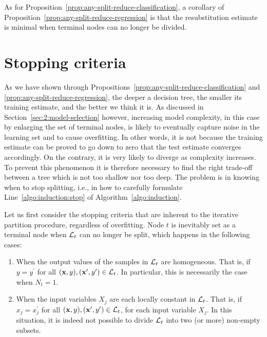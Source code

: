 As for Proposition~\ref{prop:any-split-reduce-classification}, a corollary of Proposition~\ref{prop:any-split-reduce-regression}
is that the resubstitution estimate is minimal when terminal nodes can no longer be divided.


\section{Stopping criteria}
\label{sec:3:stop}

As we have shown through Propositions~\ref{prop:any-split-reduce-classification}
and \ref{prop:any-split-reduce-regression}, the deeper a
decision tree, the smaller its training estimate, and the better we think it
is. As discussed in Section~\ref{sec:2:model-selection} however, increasing
model complexity, in this case by enlarging  the set of terminal
nodes, is likely to eventually capture noise in the learning set and to cause
overfitting. In other words, it is not because the training estimate can be
proved to go down to zero that the test estimate converges accordingly. On the
contrary, it is very likely to diverge as complexity increases. To prevent this
phenomenon it is therefore necessary to find the right trade-off between a tree
which is not too shallow nor too deep. The problem is in knowing when to stop
splitting, i.e., in how to carefully formulate Line~\ref{algo:induction:stop} of
Algorithm~\ref{algo:induction}.

Let us first consider the stopping criteria that are inherent to the iterative
partition procedure, regardless of overfitting. Node $t$ is inevitably
set as a terminal node when ${\cal L}_t$ can no longer be split, which happens in the
following cases:

\begin{enumerate}

\item When the output values of the samples in ${\cal L}_t$ are homogeneous.
That is, if $y = y^\prime$ for all $(\mathbf{x}, y),
(\mathbf{x}^\prime, y^\prime) \in {\cal L}_t$. In particular, this is
necessarily the case when $N_t = 1$.

\item When the input variables $X_j$ are each locally constant in ${\cal L}_t$.
That is, if $x_j = x^\prime_j$ for all $(\mathbf{x}, y),
(\mathbf{x}^\prime, y^\prime) \in {\cal L}_t$, for each input variable
$X_j$. In this situation, it is indeed not possible
to divide ${\cal L}_t$ into two (or more) non-empty subsets.

\end{enumerate}


